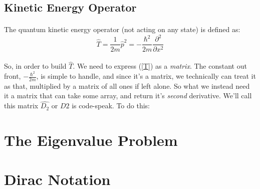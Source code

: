 \documentclass[12pt,letterpaper]{book}
\begin{document}

\subsection*{Kinetic Energy Operator}

\paragraph*{}The quantum kinetic energy operator (not acting on any state) is defined as:
\begin{equation}
\label{T}
\hat{T} = \frac{1}{2m}\hat{p}^2 = -\frac{\hbar^2}{2m} \frac{\partial^2}{\partial x^2}
\end{equation}
\paragraph*{}So, in order to build $\hat{T}$. We need to express (\ref{T}) as a \textit{matrix}. The constant out front, $-\frac{\hbar^2}{2m}$, is simple to handle, and since it's a matrix, we technically can treat it as that, multiplied by a matrix of all ones if left alone. So what we instead need it a matrix that can take some array, and return it's \textit{second} derivative. We'll call this matrix $\hat{D_2}$ or $D2$ is code-speak. To do this:



\section{The Eigenvalue Problem}


\section{Dirac Notation}


\end{document}
